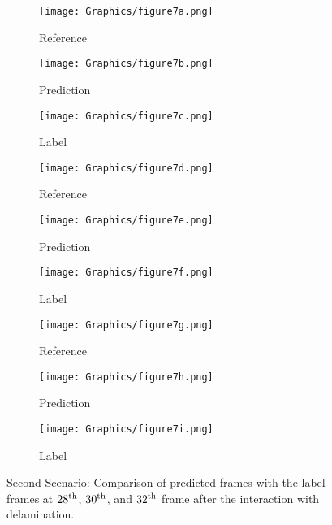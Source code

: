 \begin{figure} [!ht]
	\centering
	\begin{subfigure}[b]{0.32\textwidth}
		\centering
		\texttt{[image: Graphics/figure7a.png]}
		\caption{Reference}
		\label{fig:second_scenario_ref_28}
	\end{subfigure}
	\hfill
	\begin{subfigure}[b]{0.32\textwidth}
		\centering
		\texttt{[image: Graphics/figure7b.png]}
		\caption{Prediction}
		\label{fig:second_scenario_pred_28}
	\end{subfigure}
	\hfill
	\begin{subfigure}[b]{0.32\textwidth}
		\centering
		\texttt{[image: Graphics/figure7c.png]}
		\caption{Label}
		\label{fig:second_scenario_lab_28}
	\end{subfigure}	
	\hfill
	\begin{subfigure}[b]{0.32\textwidth}
		\centering
		\texttt{[image: Graphics/figure7d.png]}
		\caption{Reference}
		\label{fig:second_scenario_ref_30}
	\end{subfigure}
	\hfill
	\begin{subfigure}[b]{0.32\textwidth}
		\centering
		\texttt{[image: Graphics/figure7e.png]}
		\caption{Prediction}
		\label{fig:second_scenario_pred_30}
	\end{subfigure}
	\hfill
	\begin{subfigure}[b]{0.32\textwidth}
		\centering
		\texttt{[image: Graphics/figure7f.png]}
		\caption{Label}
		\label{fig:second_scenario_lab_30}
	\end{subfigure}
    	\hfill
    \begin{subfigure}[b]{0.32\textwidth}
    	\centering
    	\texttt{[image: Graphics/figure7g.png]}
    	\caption{Reference}
    	\label{fig:second_scenario_ref_32}
    \end{subfigure}
    \hfill
    \begin{subfigure}[b]{0.32\textwidth}
    	\centering
    	\texttt{[image: Graphics/figure7h.png]}
    	\caption{Prediction}
    	\label{fig:second_scenario_pred_32}
    \end{subfigure}
    \hfill
    \begin{subfigure}[b]{0.32\textwidth}
    	\centering
    	\texttt{[image: Graphics/figure7i.png]}
    	\caption{Label}
    	\label{fig:second_scenario_lab_32}
    \end{subfigure}
	
	\caption{Second Scenario: Comparison of predicted frames with the label 
		frames at $28\textsuperscript{th}$, $30\textsuperscript{th}$, and 
		$32\textsuperscript{th}$ frame after the interaction with delamination.}
	\label{fig:second_scenario}
\end{figure}
